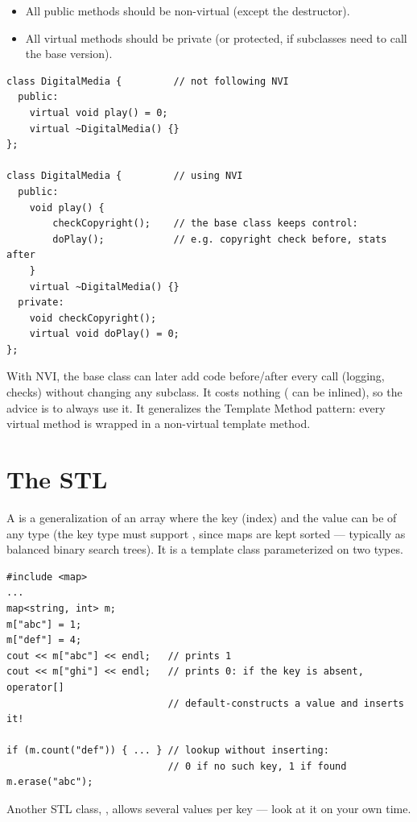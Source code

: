 \begin{important}
\begin{itemize}
  \item All public methods should be non-virtual (except the destructor).
  \item All virtual methods should be private (or protected, if subclasses need
        to call the base version).
\end{itemize}
\end{important}

\begin{lstlisting}[style=cpp]
class DigitalMedia {         // not following NVI
  public:
    virtual void play() = 0;
    virtual ~DigitalMedia() {}
};

class DigitalMedia {         // using NVI
  public:
    void play() {
        checkCopyright();    // the base class keeps control:
        doPlay();            // e.g. copyright check before, stats after
    }
    virtual ~DigitalMedia() {}
  private:
    void checkCopyright();
    virtual void doPlay() = 0;
};
\end{lstlisting}
With NVI, the base class can later add code before/after every call (logging,
checks) without changing any subclass. It costs nothing ( can be
inlined), so the advice is to always use it. It generalizes the Template Method
pattern: every virtual method is wrapped in a non-virtual template method.

\section{The STL }
A  is a generalization of an array where the key (index) and the value
can be of any type (the key type must support , since maps are
kept sorted --- typically as balanced binary search trees). It is a template
class parameterized on two types.
\begin{lstlisting}[style=cpp]
#include <map>
...
map<string, int> m;
m["abc"] = 1;
m["def"] = 4;
cout << m["abc"] << endl;   // prints 1
cout << m["ghi"] << endl;   // prints 0: if the key is absent, operator[]
                            // default-constructs a value and inserts it!

if (m.count("def")) { ... } // lookup without inserting:
                            // 0 if no such key, 1 if found
m.erase("abc");
\end{lstlisting}
Another STL class, , allows several values per key --- look at it
on your own time.

